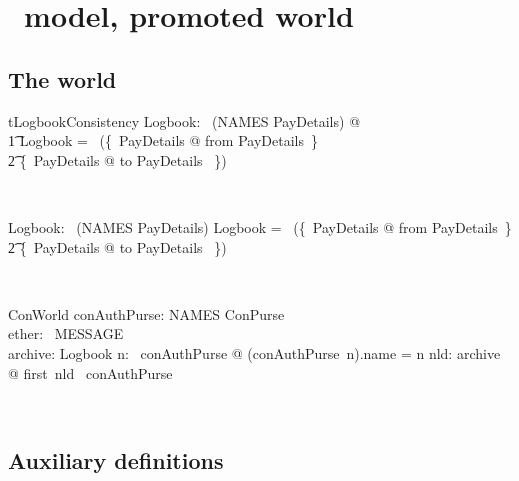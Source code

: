 \chapter{\Betw\ model, promoted world}\label{ch5}

\section{The world}

\begin{LConsistency}
\begin{theorem}{tLogbookConsistency}
    \exists Logbook: \power~(NAMES \rel PayDetails) @ \\
        \t1 Logbook = \power~(\{~PayDetails @ from \mapsto \theta PayDetails~\} \cup \\
             \t2 \{~PayDetails @ to \mapsto \theta PayDetails ~\})
\end{theorem}~\end{LConsistency}

\begin{LADef}
\begin{axdef}
   Logbook: \power~(NAMES \rel PayDetails)
\where
   Logbook = \power~(\{~PayDetails @ from \mapsto \theta PayDetails~\} \cup \\
      \t2 \{~PayDetails @ to \mapsto \theta PayDetails ~\})
\end{axdef}~\end{LADef}
%
\begin{LSDef}
\begin{schema}{ConWorld}
   conAuthPurse: NAMES \finj ConPurse \\
   ether: \power~MESSAGE \\
   archive: Logbook
\where
   \forall n: \dom~conAuthPurse @ (conAuthPurse~n).name = n
   \also
   \forall nld: archive @ first~nld \in \dom~conAuthPurse
\end{schema}~\end{LSDef}


\section{Auxiliary definitions}\label{ch5.auxworld}

